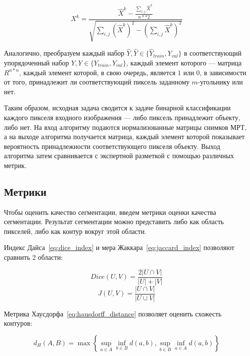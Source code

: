 \begin{equation}
\label{eq:input_norm}
  X^{k} = \frac{
    \hat{X}^{k} 
    - \frac{
      \sum_{i,j}\hat{X}^{k}
    }{
      n**2
    }
  }{\sqrt{
    \sum_{i,j}(\hat{X}^{k})^2
    - (\sum_{i,j}\hat{X}^{k})^2
  }}
\end{equation}

Аналогично, преобразуем каждый набор $\hat{Y},\hat{Y}\in{}\{\hat{Y}_{train},\hat{Y}_{val}\}$ в соответствующий упорядоченный набор $Y,Y\in{}\{Y_{train},Y_{val}\}$, каждый элемент которого — матрица $R^{n*n}$, каждый элемент которой, в свою очередь, является $1$ или $0$, в зависимости от того, принадлежит ли соответствующий пиксель заданному \mbox{$m$-угольнику} или нет.

Таким образом, исходная задача сводится к задаче бинарной классификации каждого пикселя входного изображения — либо пиксель принадлежит объекту, либо нет. На вход алгоритму подаются нормализованные матрицы снимков МРТ, а на выходе алгоритма получается матрица, каждый элемент которой показывает вероятность принадлежности соответствующего пикселя объекту. Выход алгоритма затем сравнивается с экспертной разметкой с помощью различных метрик.

\subsection{Метрики}

Чтобы оценить качество сегментации, введем метрики оценки качества сегментации. Результат сегментации можно представить либо как область пикселей, либо как контур вокруг этой области. 

Индекс Дайса~\eqref{eq:dice_index} и мера Жаккара~\eqref{eq:jaccard_index} позволяют сравнить 2 области:

\begin{equation}\label{eq:dice_index}
  Dice(U,V) = \frac{2|U\cap{}V|}{|U| + |V|}
\end{equation}
\begin{equation}\label{eq:jaccard_index}
  J(U,V) = \frac{|U\cap{}V|}{|U\cup{}V|}
\end{equation}

Метрика Хаусдорфа~\eqref{eq:hausdorff_distance} позволяет оценить схожесть контуров:

\begin{equation}\label{eq:hausdorff_distance}
  d_{H}(A,B)=\max\left\{\sup_{a\in{}A}\inf_{b\in{}B}d(a,b),\sup_{b\in{}B}\inf_{a\in{}A}d(a,b)\right\}
\end{equation}

